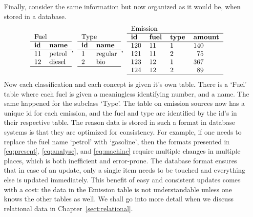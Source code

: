 Finally, consider the same information but now organized as it would be, 
when stored in a database.
%
\begin{equation}
\begin{tabular}{ll}
\multicolumn{2}{l}{Fuel}\\
\hline
\textbf{id} & \textbf{name}\\
\hline
11 & petrol  \\
12 & diesel \\
\hline
\end{tabular}\textrm{, }\:
%
\begin{tabular}{ll}
\multicolumn{2}{l}{Type}\\
\hline
\textbf{id} & \textbf{name}\\
\hline
1 & regular \\
2 & bio \\
\hline
\end{tabular}\textrm{, }\:
%
\begin{tabular}{llll}
\multicolumn{3}{l}{Emission}\\
\hline
\textbf{id} & \textbf{fuel} & \textbf{type} & \textbf{amount} \\
\hline
120 & 11 &1 &140\\
121 & 11 &2 &\phantom{0}75\\
123 & 12 &1 &367\\
124 & 12 &2 &\phantom{0}89\\
\hline
\end{tabular}
\label{eq:database}
\end{equation}
Now each classification and each concept is given it's own table. There is a
`Fuel' table where each fuel is given a meaningless identifying number, and a
name. The same happened for the subclass `Type'. The table on emission sources
now has a unique id for each emission, and the fuel and type are identified by
the id's in their respective table. The reason data is stored in such a format
in database systems is that they are optimized for consistency. For example, if
one needs to replace the fuel name `petrol' with `gasoline', then the formats
presented in \eqref{eq:present}, \eqref{eq:analyse}, and \eqref{eq:machine}
require multiple changes in multiple places, which is both inefficient and
error-prone.  The database format ensures that in case of an update, only a
single item needs to be touched and everything else is updated immediately.
This benefit of easy and consistent updates comes with a cost: the data in the
Emission table is not understandable unless one knows the other tables as well.
We shall go into more detail when we discuss relational data in
Chapter~\ref{sect:relational}.


